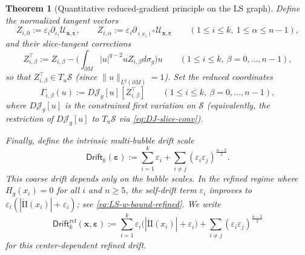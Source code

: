 \documentclass[11pt,reqno,a4paper]{amsart}
\numberwithin{equation}{section}
\theoremstyle{plain}
\newtheorem{theorem}{Theorem}[section]
\theoremstyle{remark}
\theoremstyle{plain}
\begin{document}
\begin{theorem}[Quantitative reduced-gradient principle on the LS graph]
Define the normalized tangent vectors
\[
Z_{i,0}:=\varepsilon_i\partial_{\varepsilon_i}\mathcal U_{\mathbf x,\boldsymbol\varepsilon},\qquad
Z_{i,\alpha}:=\varepsilon_i\partial_{(x_i)^\alpha}\mathcal U_{\mathbf x,\boldsymbol\varepsilon}
\qquad(1\le i\le k,\ 1\le\alpha\le n-1),
\]
and their slice-tangent corrections
\[
Z_{i,\beta}^{\top}
:=Z_{i,\beta}-\Big(\int_{\partial M}|u|^{q-2}uZ_{i,\beta}d\sigma_g\Big)u
\qquad(1\le i\le k,\ \beta=0,\dots,n-1),
\]
so that $Z_{i,\beta}^{\top}\in T_u\mathcal S$ (since $\|u\|_{L^q(\partial M)}=1$).
Set the reduced coordinates
\[
\Gamma_{i,\beta}(u):=D\mathcal J_g[u][Z_{i,\beta}^{\top}]
\qquad(1\le i\le k,\ \beta=0,\dots,n-1),
\]
where $D\mathcal J_g[u]$ is the constrained first variation on $\mathcal S$
(equivalently, the restriction of $D\mathcal J_g[u]$ to $T_u\mathcal S$ via \eqref{eq:DJ-slice-conv}).

Finally, define the intrinsic \emph{multi-bubble drift scale}
\begin{equation}\label{eq:k-drift}
\mathsf{Drift}_k(\boldsymbol\varepsilon)
:=\sum_{i=1}^k\varepsilon_i
+
\sum_{i\ne j}(\varepsilon_i\varepsilon_j)^{\frac{n-2}{2}}.
\end{equation}
This coarse drift depends only on the bubble scales.
In the refined regime where $H_g(x_i)=0$ for all $i$ and $n\ge 5$, the
self-drift term $\varepsilon_i$ improves to
$\varepsilon_i(|\mathring{\mathrm{II}}(x_i)|+\varepsilon_i)$; see
\eqref{eq:LS-w-bound-refined}.  We write
\begin{equation}\label{eq:k-drift-refined}
\mathsf{Drift}^{\mathrm{ref}}_k(\mathbf x,\boldsymbol\varepsilon)
:=
\sum_{i=1}^k
\varepsilon_i\bigl(|\mathring{\mathrm{II}}(x_i)|+\varepsilon_i\bigr)
+
\sum_{i\ne j}(\varepsilon_i\varepsilon_j)^{\frac{n-2}{2}}
\end{equation}
for this center-dependent refined drift.


\end{theorem}
\end{document}
